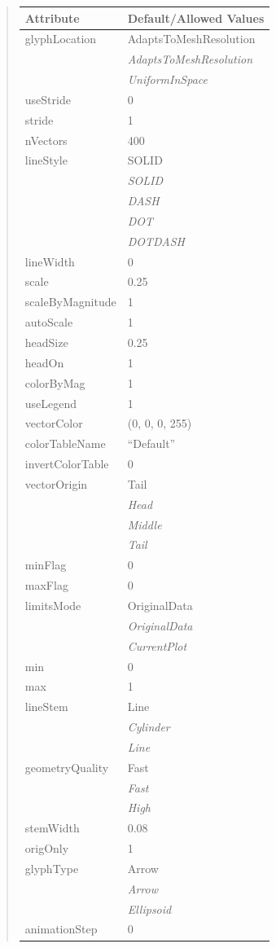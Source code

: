 \documentclass[letterpaper,10pt,english]{sphinxmanual}
\begin{document}
\begin{quote}
\begin{longtable}{|l|l|}
\textbf{Attribute}
 & 
\textbf{Default/Allowed Values}
\\
\hline
glyphLocation
 & 
AdaptsToMeshResolution
\\
\hline & 
\emph{AdaptsToMeshResolution}
\\
\hline & 
\emph{UniformInSpace}
\\
\hline
useStride
 & 
0
\\
\hline
stride
 & 
1
\\
\hline
nVectors
 & 
400
\\
\hline
lineStyle
 & 
SOLID
\\
\hline & 
\emph{SOLID}
\\
\hline & 
\emph{DASH}
\\
\hline & 
\emph{DOT}
\\
\hline & 
\emph{DOTDASH}
\\
\hline
lineWidth
 & 
0
\\
\hline
scale
 & 
0.25
\\
\hline
scaleByMagnitude
 & 
1
\\
\hline
autoScale
 & 
1
\\
\hline
headSize
 & 
0.25
\\
\hline
headOn
 & 
1
\\
\hline
colorByMag
 & 
1
\\
\hline
useLegend
 & 
1
\\
\hline
vectorColor
 & 
(0, 0, 0, 255)
\\
\hline
colorTableName
 & 
``Default''
\\
\hline
invertColorTable
 & 
0
\\
\hline
vectorOrigin
 & 
Tail
\\
\hline & 
\emph{Head}
\\
\hline & 
\emph{Middle}
\\
\hline & 
\emph{Tail}
\\
\hline
minFlag
 & 
0
\\
\hline
maxFlag
 & 
0
\\
\hline
limitsMode
 & 
OriginalData
\\
\hline & 
\emph{OriginalData}
\\
\hline & 
\emph{CurrentPlot}
\\
\hline
min
 & 
0
\\
\hline
max
 & 
1
\\
\hline
lineStem
 & 
Line
\\
\hline & 
\emph{Cylinder}
\\
\hline & 
\emph{Line}
\\
\hline
geometryQuality
 & 
Fast
\\
\hline & 
\emph{Fast}
\\
\hline & 
\emph{High}
\\
\hline
stemWidth
 & 
0.08
\\
\hline
origOnly
 & 
1
\\
\hline
glyphType
 & 
Arrow
\\
\hline & 
\emph{Arrow}
\\
\hline & 
\emph{Ellipsoid}
\\
\hline
animationStep
 & 
0
\\
\hline\end{longtable}


\end{quote}
\end{document}
